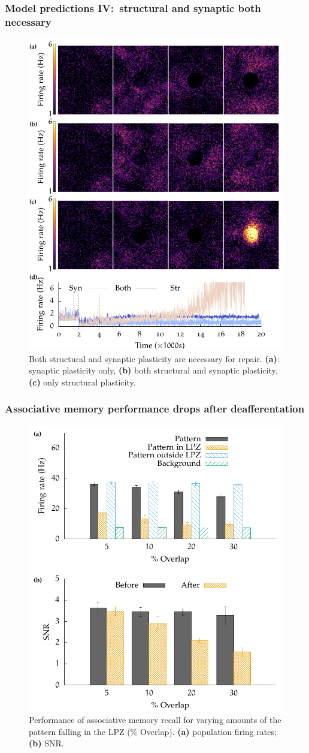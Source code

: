\begin{frame}[c]
  \frametitle{Model predictions IV:\ structural and synaptic both necessary}
  \begin{figure}[h]
    \centering
    \includegraphics[width=0.50\linewidth]{99_images/syn-str-both}
    \caption{Both structural and synaptic plasticity are necessary for repair. \textbf{(a)}: synaptic plasticity only, \textbf{(b)} both structural and synaptic plasticity, \textbf{(c)} only structural plasticity.}
  \end{figure}
\end{frame}
\begin{frame}[c]
  \frametitle{Associative memory performance drops after deafferentation}
  \begin{figure}[h]
    \centering
    \includegraphics[width=0.55\linewidth]{99_images/performance-deaff-only}
    \caption{Performance of associative memory recall for varying amounts of the pattern falling in the LPZ (\% Overlap). \textbf{(a)} population firing rates; \textbf{(b)} SNR\@.}
  \end{figure}
\end{frame}
